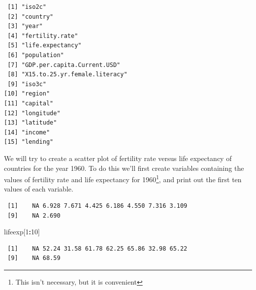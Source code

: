 \documentclass[
]{krantz}
\makeatletter
\newenvironment{Shaded}{\begin{snugshade}}{\end{snugshade}}
\newcommand{\DecValTok}[1]{\textcolor[rgb]{0.06,0.06,0.06}{#1}}
\newcommand{\NormalTok}[1]{#1}
\newcommand{\OperatorTok}[1]{\textcolor[rgb]{0.43,0.43,0.43}{\textbf{#1}}}
\newcommand{\StringTok}[1]{\textcolor[rgb]{0.5,0.5,0.5}{#1}}
\newenvironment{kframe}{%
\medskip{}
\setlength{\fboxsep}{.8em}
 \def\at@end@of@kframe{}%
 \ifinner\ifhmode%
  \def\at@end@of@kframe{\end{minipage}}%
  \begin{minipage}{\columnwidth}%
 \fi\fi%
 \def\FrameCommand##1{\hskip\@totalleftmargin \hskip-\fboxsep
 \colorbox{shadecolor}{##1}\hskip-\fboxsep
     \hskip-\linewidth \hskip-\@totalleftmargin \hskip\columnwidth}%
 \MakeFramed {\advance\hsize-\width
   \@totalleftmargin\z@ \linewidth\hsize
   \@setminipage}}%
 {\par\unskip\endMakeFramed%
 \at@end@of@kframe}
\renewenvironment{Shaded}{\begin{kframe}}{\end{kframe}}
\makeatother
\begin{document}
\begin{verbatim}
 [1] "iso2c"                       
 [2] "country"                     
 [3] "year"                        
 [4] "fertility.rate"              
 [5] "life.expectancy"             
 [6] "population"                  
 [7] "GDP.per.capita.Current.USD"  
 [8] "X15.to.25.yr.female.literacy"
 [9] "iso3c"                       
[10] "region"                      
[11] "capital"                     
[12] "longitude"                   
[13] "latitude"                    
[14] "income"                      
[15] "lending"                     
\end{verbatim}

We will try to create a scatter plot of fertility rate versus life expectancy of countries for the year 1960. To do this we'll first create variables containing the values of fertility rate and life expectancy for 1960\footnote{This isn't necessary, but it is convenient}, and print out the first ten values of each variable.

\begin{Shaded}
\end{Shaded}

\begin{verbatim}
 [1]    NA 6.928 7.671 4.425 6.186 4.550 7.316 3.109
 [9]    NA 2.690
\end{verbatim}

\begin{Shaded}
\begin{Highlighting}[]
\NormalTok{lifeexp[}\DecValTok{1}\OperatorTok{:}\DecValTok{10}\NormalTok{]}
\end{Highlighting}
\end{Shaded}

\begin{verbatim}
 [1]    NA 52.24 31.58 61.78 62.25 65.86 32.98 65.22
 [9]    NA 68.59
\end{verbatim}
\end{document}
